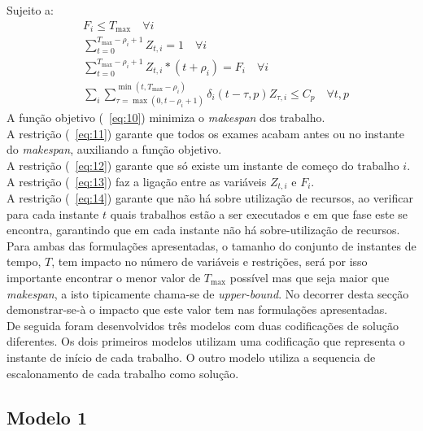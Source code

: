 Sujeito a:
\begin{align}
&F_{i} \leq T_{\max} \quad \forall i \label{eq:11} \\
&\sum^{T_{\max}-\rho_{i}+1}_{t=0}Z_{t,i} = 1 \quad \forall i \label{eq:12} \\
&\sum^{T_{\max}-\rho_{i}+1}_{t=0}Z_{t,i}*(t+\rho_{i}) = F_{i} \quad \forall i \label{eq:13} \\
&\sum_{i}\sum^{\min(t, T_{\max}-\rho_{i})}_{\tau=\max(0, t-\rho_{i}+1)}\delta_{i}(t-\tau,p)Z_{\tau,i} \leq C_{p} \quad \forall t,p \label{eq:14}
\end{align}
A função objetivo (~\ref{eq:10}) minimiza o \textit{makespan} dos trabalho.\\
A restrição (~\ref{eq:11}) garante que todos os exames acabam antes ou no instante do \textit{makespan}, auxiliando a função objetivo.\\
A restrição (~\ref{eq:12}) garante que só existe um instante de começo do trabalho $i$.\\
A restrição (~\ref{eq:13}) faz a ligação entre as variáveis $Z_{t,i}$ e $F_{i}$.\\
A restrição (~\ref{eq:14}) garante que não há sobre utilização de recursos, ao verificar para cada instante $t$ quais trabalhos estão a ser executados e em que fase este se encontra, garantindo que em cada instante não há sobre-utilização de recursos.\\

Para ambas das formulações apresentadas, o tamanho do conjunto de instantes de tempo, $T$, tem impacto no número de variáveis e restrições, será por isso importante encontrar o menor valor de $T_{\max}$ possível mas que seja maior que \textit{makespan}, a isto tipicamente chama-se de \textit{upper-bound}. No decorrer desta secção demonstrar-se-à o impacto que este valor tem nas formulações apresentadas.\\ 

De seguida foram desenvolvidos três modelos com duas codificações de solução diferentes. Os dois primeiros modelos utilizam uma codificação que representa o instante de início de cada trabalho. O outro modelo utiliza a sequencia de escalonamento de cada trabalho como solução.\\

\subsection{Modelo 1}

